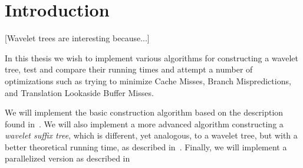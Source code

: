 \section{Introduction}
[Wavelet trees are interesting because...]

In this thesis we wish to implement various algorithms for constructing a wavelet tree, test and compare their running times and attempt a number of optimizations such as trying to minimize Cache Misses, Branch Mispredictions, and Translation Lookaside Buffer Misses.

We will implement the basic construction algorithm based on the description found in~\citep{ Navjda13}. We will also implement a more advanced algorithm constructing a \textit{wavelet suffix tree}, which is different, yet analogous, to a wavelet tree, but with a better theoretical running time, as described in~\citep{DBLP:journals/corr/BabenkoGKS14}. Finally, we will implement a parallelized version as described in~\citep{DBLP:journals/corr/Shun14}
